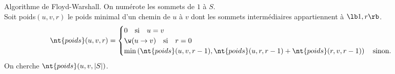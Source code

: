 \documentclass[french, 11pt]{article}
\begin{document}
\begin{defi}{Algorithme de Floyd-Warshall.}{}
    On numérote les sommets de $1$ à $S$.\\
    Soit poids$(u,v,r)$ le poids minimal d'un chemin de $u$ à $v$ dont les sommets intermédiaires appartiennent à $\lb1,r\rb$.
    \begin{equation*}
        \nt{poids}(u,v,r) = \begin{cases}
            0 \quad \text{si} \quad u=v\\
            \w(u\to v) \quad \text{si} \quad r=0\\
            \min\left(\nt{poids}(u,v,r-1),\nt{poids}(u,r,r-1)+\nt{poids}(r,v,r-1)\right) \quad \text{sinon}.
        \end{cases}
    \end{equation*}
    On cherche $\nt{poids}(u,v,|S|)$.\n
     \begin{algorithm}[H]
        \caption{Algorithme de Floyd-Warshall.}
    \end{algorithm}

\end{defi}

\fin
\end{document}
